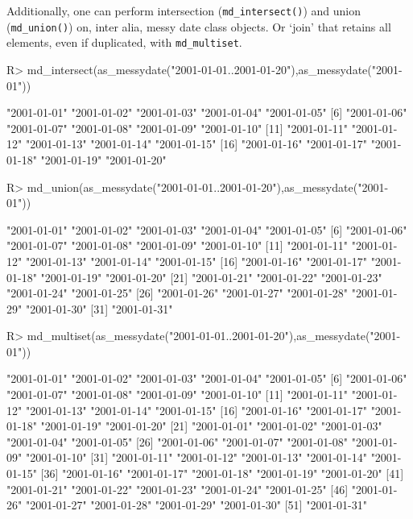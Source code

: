 \documentclass[
]{jss}
\begin{document}
Additionally, one can perform intersection (\texttt{md\_intersect()})
and union (\texttt{md\_union()}) on, inter alia, messy date class
objects. Or `join' that retains all elements, even if duplicated, with
\texttt{md\_multiset}.

\begin{CodeChunk}
\begin{CodeInput}
R> md_intersect(as_messydate("2001-01-01..2001-01-20"),as_messydate("2001-01"))
\end{CodeInput}
\begin{CodeOutput}
 [1] "2001-01-01" "2001-01-02" "2001-01-03" "2001-01-04" "2001-01-05"
 [6] "2001-01-06" "2001-01-07" "2001-01-08" "2001-01-09" "2001-01-10"
[11] "2001-01-11" "2001-01-12" "2001-01-13" "2001-01-14" "2001-01-15"
[16] "2001-01-16" "2001-01-17" "2001-01-18" "2001-01-19" "2001-01-20"
\end{CodeOutput}
\begin{CodeInput}
R> md_union(as_messydate("2001-01-01..2001-01-20"),as_messydate("2001-01"))
\end{CodeInput}
\begin{CodeOutput}
 [1] "2001-01-01" "2001-01-02" "2001-01-03" "2001-01-04" "2001-01-05"
 [6] "2001-01-06" "2001-01-07" "2001-01-08" "2001-01-09" "2001-01-10"
[11] "2001-01-11" "2001-01-12" "2001-01-13" "2001-01-14" "2001-01-15"
[16] "2001-01-16" "2001-01-17" "2001-01-18" "2001-01-19" "2001-01-20"
[21] "2001-01-21" "2001-01-22" "2001-01-23" "2001-01-24" "2001-01-25"
[26] "2001-01-26" "2001-01-27" "2001-01-28" "2001-01-29" "2001-01-30"
[31] "2001-01-31"
\end{CodeOutput}
\begin{CodeInput}
R> md_multiset(as_messydate("2001-01-01..2001-01-20"),as_messydate("2001-01"))
\end{CodeInput}
\begin{CodeOutput}
 [1] "2001-01-01" "2001-01-02" "2001-01-03" "2001-01-04" "2001-01-05"
 [6] "2001-01-06" "2001-01-07" "2001-01-08" "2001-01-09" "2001-01-10"
[11] "2001-01-11" "2001-01-12" "2001-01-13" "2001-01-14" "2001-01-15"
[16] "2001-01-16" "2001-01-17" "2001-01-18" "2001-01-19" "2001-01-20"
[21] "2001-01-01" "2001-01-02" "2001-01-03" "2001-01-04" "2001-01-05"
[26] "2001-01-06" "2001-01-07" "2001-01-08" "2001-01-09" "2001-01-10"
[31] "2001-01-11" "2001-01-12" "2001-01-13" "2001-01-14" "2001-01-15"
[36] "2001-01-16" "2001-01-17" "2001-01-18" "2001-01-19" "2001-01-20"
[41] "2001-01-21" "2001-01-22" "2001-01-23" "2001-01-24" "2001-01-25"
[46] "2001-01-26" "2001-01-27" "2001-01-28" "2001-01-29" "2001-01-30"
[51] "2001-01-31"
\end{CodeOutput}
\end{CodeChunk}
\end{document}
